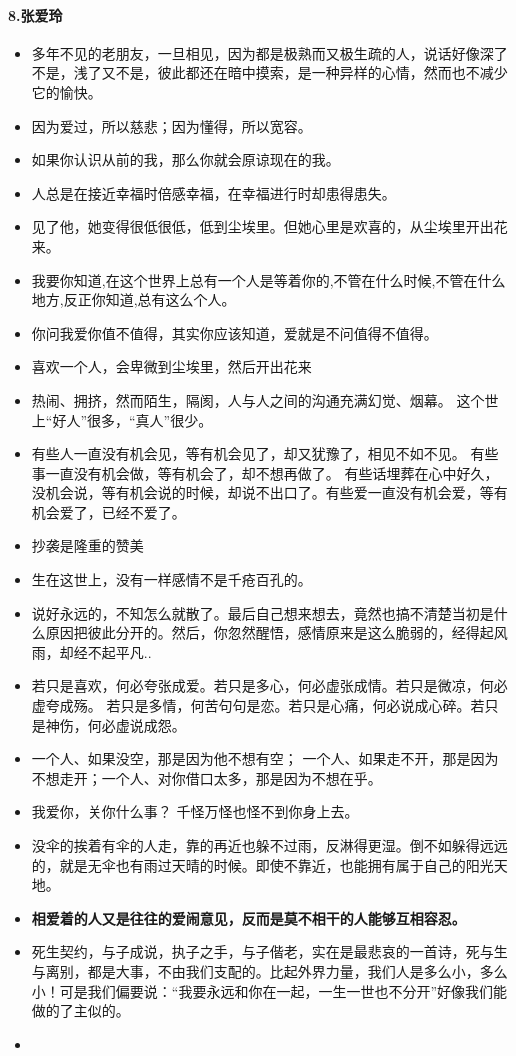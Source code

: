 \documentclass[UTF8,a4paper,8pt]{ctexbook}
\begin{document}
	\paragraph{8.张爱玲}
	\begin{itemize}
		\item  多年不见的老朋友，一旦相见，因为都是极熟而又极生疏的人，说话好像深了不是，浅了又不是，彼此都还在暗中摸索，是一种异样的心情，然而也不减少它的愉快。
		\item  因为爱过，所以慈悲；因为懂得，所以宽容。
		\item  如果你认识从前的我，那么你就会原谅现在的我。
		\item  人总是在接近幸福时倍感幸福，在幸福进行时却患得患失。
		\item  见了他，她变得很低很低，低到尘埃里。但她心里是欢喜的，从尘埃里开出花来。
		\item  我要你知道,在这个世界上总有一个人是等着你的,不管在什么时候,不管在什么地方,反正你知道,总有这么个人。
		\item  你问我爱你值不值得，其实你应该知道，爱就是不问值得不值得。
		\item  喜欢一个人，会卑微到尘埃里，然后开出花来
		\item  热闹、拥挤，然而陌生，隔阂，人与人之间的沟通充满幻觉、烟幕。 这个世上“好人”很多，“真人”很少。
		\item  有些人一直没有机会见，等有机会见了，却又犹豫了，相见不如不见。 有些事一直没有机会做，等有机会了，却不想再做了。 有些话埋葬在心中好久，没机会说，等有机会说的时候，却说不出口了。有些爱一直没有机会爱，等有机会爱了，已经不爱了。
		\item  抄袭是隆重的赞美
		\item  生在这世上，没有一样感情不是千疮百孔的。
		\item  说好永远的，不知怎么就散了。最后自己想来想去，竟然也搞不清楚当初是什么原因把彼此分开的。然后，你忽然醒悟，感情原来是这么脆弱的，经得起风雨，却经不起平凡..
		\item  若只是喜欢，何必夸张成爱。若只是多心，何必虚张成情。若只是微凉，何必虚夸成殇。 若只是多情，何苦句句是恋。若只是心痛，何必说成心碎。若只是神伤，何必虚说成怨。
		\item  一个人、如果没空，那是因为他不想有空； 一个人、如果走不开，那是因为不想走开；一个人、对你借口太多，那是因为不想在乎。
		\item  我爱你，关你什么事？ 千怪万怪也怪不到你身上去。
		\item  没伞的挨着有伞的人走，靠的再近也躲不过雨，反淋得更湿。倒不如躲得远远的，就是无伞也有雨过天晴的时候。即使不靠近，也能拥有属于自己的阳光天地。
		\item  \textbf{相爱着的人又是往往的爱闹意见，反而是莫不相干的人能够互相容忍。}
		\item  死生契约，与子成说，执子之手，与子偕老，实在是最悲哀的一首诗，死与生与离别，都是大事，不由我们支配的。比起外界力量，我们人是多么小，多么小！可是我们偏要说：“我要永远和你在一起，一生一世也不分开”好像我们能做的了主似的。
		\item 
	\end{itemize}		
\end{document}
